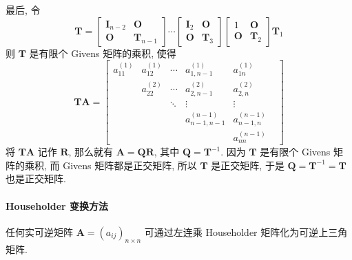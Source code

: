 \par 最后, 令
$$
    \bm{T} = \begin{bmatrix}
        \bm{I}_{n-2} & \bm{O}       \\
        \bm{O}       & \bm{T}_{n-1}
    \end{bmatrix} \cdots \begin{bmatrix}
        \bm{I}_2 & \bm{O}   \\
        \bm{O}   & \bm{T}_3
    \end{bmatrix} \begin{bmatrix}
        1      & \bm{O}   \\
        \bm{O} & \bm{T}_2
    \end{bmatrix} \bm{T}_1
$$
则 $\bm{T}$ 是有限个 Givens 矩阵的乘积, 使得
$$
    \bm{TA} = \begin{bmatrix}
        a_{11}^{(1)} & a_{12}^{(1)} & \cdots & a_{1,n-1}^{(1)}          & a_{1n}^{(1)}        \\
                     & a_{22}^{(2)} & \cdots & a_{2, n-1}^{(2)}         & a_{2, n}^{(2)}      \\
                     &              & \ddots & \vdots                   & \vdots            & \\
                     &              &        & a_{n - 1, n - 1}^{(n-1)} & a_{n-1,n}^{(n-1)}   \\
                     &              &        &                          & a_{nn}^{(n-1)}
    \end{bmatrix}
$$
将 $\bm{TA}$ 记作 $\bm{R}$, 那么就有 $\bm{A} = \bm{QR}$, 其中 $\bm{Q} = \bm{T}^{-1}$. 因为 $\bm{T}$ 是有限个 Givens 矩阵的乘积,
而 Givens 矩阵都是正交矩阵, 所以 $\bm{T}$ 是正交矩阵, 于是 $\bm{Q} = \bm{T}^{-1} = \bm{T}$ 也是正交矩阵.

\paragraph[]{Householder 变换方法}

\par 任何实可逆矩阵 $\bm{A} = (a_{ij})_{n\times n}$ 可通过左连乘 Householder 矩阵化为可逆上三角矩阵.

